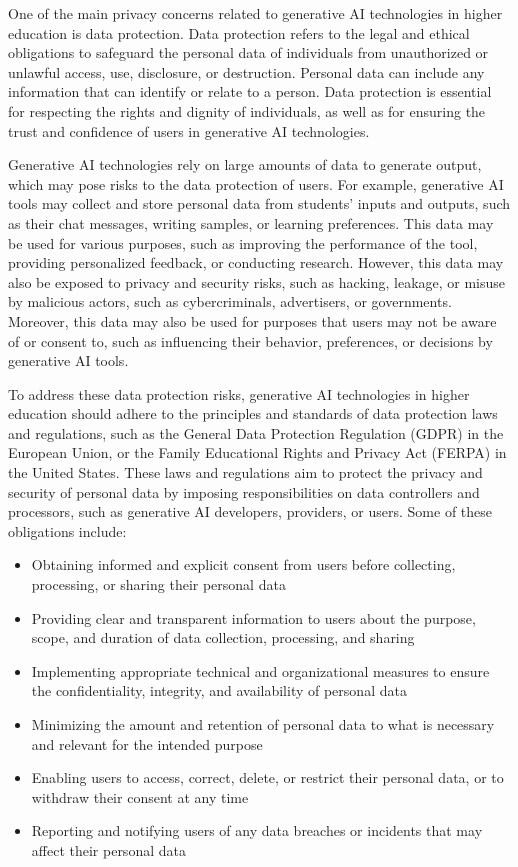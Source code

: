 \documentclass[a4paper,12pt]{report}
\begin{document}
One of the main privacy concerns related to generative AI technologies in higher education is data protection. Data protection refers to the legal and ethical obligations to safeguard the personal data of individuals from unauthorized or unlawful access, use, disclosure, or destruction. Personal data can include any information that can identify or relate to a person. Data protection is essential for respecting the rights and dignity of individuals, as well as for ensuring the trust and confidence of users in generative AI technologies.

Generative AI technologies rely on large amounts of data to generate output, which may pose risks to the data protection of users. For example, generative AI tools may collect and store personal data from students’ inputs and outputs, such as their chat messages, writing samples, or learning preferences. This data may be used for various purposes, such as improving the performance of the tool, providing personalized feedback, or conducting research. However, this data may also be exposed to privacy and security risks, such as hacking, leakage, or misuse by malicious actors, such as cybercriminals, advertisers, or governments. Moreover, this data may also be used for purposes that users may not be aware of or consent to, such as influencing their behavior, preferences, or decisions by generative AI tools.

To address these data protection risks, generative AI technologies in higher education should adhere to the principles and standards of data protection laws and regulations, such as the General Data Protection Regulation (GDPR) in the European Union, or the Family Educational Rights and Privacy Act (FERPA) in the United States. These laws and regulations aim to protect the privacy and security of personal data by imposing responsibilities on data controllers and processors, such as generative AI developers, providers, or users. Some of these obligations include:

\begin{itemize}
    \item Obtaining informed and explicit consent from users before collecting, processing, or sharing their personal data
    \item Providing clear and transparent information to users about the purpose, scope, and duration of data collection, processing, and sharing
    \item Implementing appropriate technical and organizational measures to ensure the confidentiality, integrity, and availability of personal data
    \item Minimizing the amount and retention of personal data to what is necessary and relevant for the intended purpose
    \item Enabling users to access, correct, delete, or restrict their personal data, or to withdraw their consent at any time
    \item Reporting and notifying users of any data breaches or incidents that may affect their personal data
\end{itemize}
\end{document}
